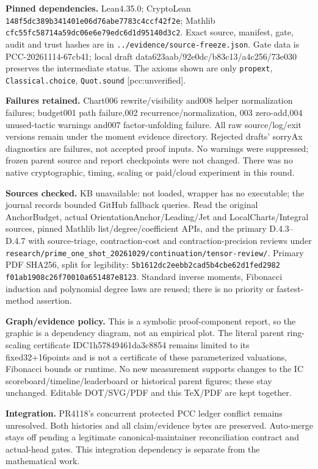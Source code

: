 \documentclass[10pt]{article}
\begin{document}
\textbf{Pinned dependencies.} Lean4.35.0; CryptoLean
\texttt{148f5dc389b341401e06d76abe7783c4ccf42f2e}; Mathlib
\texttt{cfc55fc58714a59dc06e6e79edc6d1d95140d3c2}. Exact source,
manifest, gate, audit and trust hashes are in
\texttt{../evidence/source-freeze.json}. Gate data is
PCC-20261114-67cb41; local draft data623aab/92e0dc/b83c13/a4c256/73e030
preserves the intermediate status. The axioms shown are only
\texttt{propext}, \texttt{Classical.choice}, \texttt{Quot.sound}
[pcc:unverified].

\textbf{Failures retained.} Chart006 rewrite/visibility and008 helper
normalization failures; budget001 path failure,002 recurrence/normalization,
003 zero-add,004 unused-tactic warnings and007 factor-unfolding failure.
All raw source/log/exit versions remain under the moment evidence directory.
Rejected drafts' sorryAx diagnostics are failures, not accepted proof inputs.
No warnings were suppressed; frozen parent source and report checkpoints
were not changed. There was no native cryptographic, timing, scaling or
paid/cloud experiment in this round.

\textbf{Sources checked.} KB unavailable: not loaded, wrapper has no
executable; the journal records bounded GitHub fallback queries. Read the
original AnchorBudget, actual OrientationAnchor/Leading/Jet and
LocalCharts/Integral sources, pinned Mathlib list/degree/coefficient APIs,
and the primary D.4.3--D.4.7 with source-triage, contraction-cost and
contraction-precision reviews under
\texttt{research/prime\_one\_shot\_20261029/continuation/tensor-review/}.
Primary PDF SHA256, split for legibility:
\texttt{5b1612dc2eebb2cad5b4cbe62d1fed2982}\\
\texttt{f01ab1908c26f70010a651487e8123}.
Standard inverse moments, Fibonacci induction and polynomial degree laws
are reused; there is no priority or fastest-method assertion.

\textbf{Graph/evidence policy.} This is a symbolic proof-component report,
so the graphic is a dependency diagram, not an empirical plot. The literal
parent ring-scaling certificate IDC1h57849461da3c8854 remains limited to its
fixed32+16points and is not a certificate of these parameterized valuations,
Fibonacci bounds or runtime. No new measurement supports changes to the
IC scoreboard/timeline/leaderboard or historical parent figures; these stay
unchanged. Editable DOT/SVG/PDF and this TeX/PDF are kept together.

\textbf{Integration.} PR4118's concurrent protected PCC ledger conflict
remains unresolved. Both histories and all claim/evidence bytes are
preserved. Auto-merge stays off pending a legitimate canonical-maintainer
reconciliation contract and actual-head gates. This integration dependency
is separate from the mathematical work.
\end{document}
